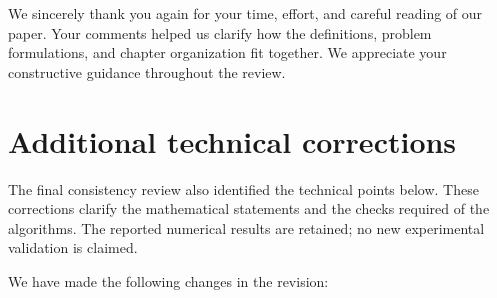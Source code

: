 \documentclass[11pt]{article}
\begin{document}
We sincerely thank you again for your time, effort, and careful reading
of our paper. Your comments helped us clarify how the definitions, problem
formulations, and chapter organization fit together. We appreciate your
constructive guidance throughout the review.


\newpage
\section*{Additional technical corrections}
The final consistency review also identified the technical points below.
These corrections clarify the mathematical statements and the checks required
of the algorithms. The reported numerical results are retained; no new
experimental validation is claimed.

We have made the following changes in the revision:
\end{document}
